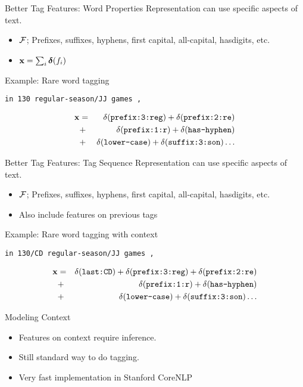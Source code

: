\documentclass{beamer}
\begin{document}
\begin{frame}{Better Tag Features: Word Properties}
  Representation can use specific aspects of text.
  \begin{itemize}
  \item $\mathcal{F}$; Prefixes, suffixes, hyphens, first capital, all-capital, hasdigits, etc. 
  \item $\mathbf{x} = \sum_{i} \boldsymbol{\delta}(f_i)$ 
  \end{itemize}

  Example: Rare word tagging

  \begin{center}
    \texttt{in 130 regular-season/JJ games ,}
  \end{center}
  \begin{eqnarray*} 
    \mathbf{x} &=& \delta(\texttt{prefix:3:reg}) + \delta(\texttt{prefix:2:re}) \\
    &+& \delta(\texttt{prefix:1:r}) + \delta(\texttt{has-hyphen}) \\
    &+& \delta(\texttt{lower-case}) + \delta(\texttt{suffix:3:son}) \ldots
  \end{eqnarray*}
\end{frame}

\begin{frame}{Better Tag Features: Tag Sequence}
  Representation can use specific aspects of text.
  \begin{itemize}
  \item $\mathcal{F}$; Prefixes, suffixes, hyphens, first capital, all-capital, hasdigits, etc.
  \item \alert{Also} include features on previous tags
  \end{itemize}

  Example: Rare word tagging with context

  \begin{center}
    \texttt{in 130/CD regular-season/JJ games ,}
  \end{center}
  \begin{eqnarray*} 
    \mathbf{x} &=& \delta(\texttt{last:CD}) + \delta(\texttt{prefix:3:reg}) + \delta(\texttt{prefix:2:re}) \\
    &+& \delta(\texttt{prefix:1:r}) + \delta(\texttt{has-hyphen}) \\
    &+& \delta(\texttt{lower-case}) + \delta(\texttt{suffix:3:son}) \ldots
  \end{eqnarray*}
\end{frame}

\begin{frame}{Modeling Context}
  \begin{itemize}
  \item Features on context require inference.
  \item Still standard way to do tagging. 
  \item Very fast implementation in Stanford CoreNLP 
  \end{itemize}
\end{frame}
\end{document}
